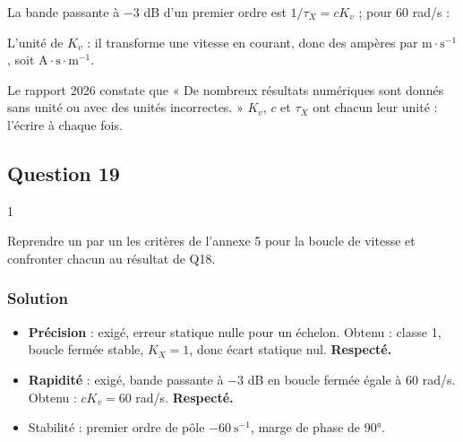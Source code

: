 \documentclass[11pt,a4paper]{article}
\providecommand{\tightlist}{\setlength{\itemsep}{0pt}\setlength{\parskip}{0pt}}
\newcommand{\equationajustee}[1]{%
  \sbox{\boiteequation}{$\displaystyle #1$}%
  \ifdim\wd\boiteequation>\linewidth
    \[\resizebox{\linewidth}{!}{\usebox{\boiteequation}}\]%
  \else
    \[#1\]%
  \fi}
\begin{document}
La bande passante à \(-3\) dB d'un premier ordre est \(1/\tau_X=cK_v\) ; pour 60 rad/s :

\equationajustee{
\begin{aligned}
K_v&=\boxed{12\ \mathrm{A\cdot s\cdot m^{-1}}}\\
\tau_X&=\frac1{60}\approx1{,}7\cdot10^{-2}\ \text{s}
\end{aligned}
}

\begin{piege}

L'unité de \(K_v\) : il transforme une vitesse en courant, donc des ampères par \(\mathrm{m\cdot s^{-1}}\), soit \(\mathrm{A\cdot s\cdot m^{-1}}\).

\end{piege}

\begin{jury}

Le rapport 2026 constate que « De nombreux résultats numériques sont donnés sans unité ou avec des unités incorrectes. » \(K_v\), \(c\) et \(\tau_X\) ont chacun leur unité : l'écrire à chaque fois.

\end{jury}

\hypertarget{question-19}{%
\subsection{Question 19}\label{question-19}}

\begin{indication}{1}

Reprendre un par un les critères de l'annexe 5 pour la boucle de vitesse et confronter chacun au résultat de Q18.

\end{indication}

\hypertarget{solution-18}{%
\subsubsection{Solution}\label{solution-18}}

\begin{itemize}
\tightlist
\item
  \textbf{Précision} : exigé, erreur statique nulle pour un échelon. Obtenu : classe 1, boucle fermée stable, \(K_X=1\), donc écart statique nul. \textbf{Respecté.}
\item
  \textbf{Rapidité} : exigé, bande passante à \(-3\) dB en boucle fermée égale à 60 rad/s. Obtenu : \(cK_v=60\) rad/s. \textbf{Respecté.}
\item
  Stabilité : premier ordre de pôle \(-60\ \mathrm{s^{-1}}\), marge de phase de 90°.
\end{itemize}
\end{document}
